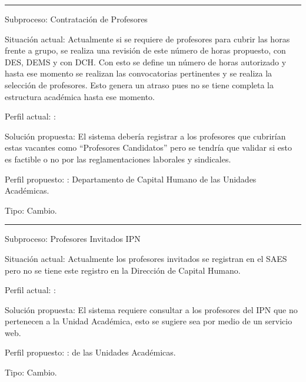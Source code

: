 \hrule
\vspace{0.2cm}
\begin{Cdescription}
	\item[Subproceso:] Contratación de Profesores
	\item[Situación actual:] Actualmente si se requiere de profesores para cubrir las horas frente a grupo, se realiza una revisión de este número de horas propuesto, con DES, DEMS y con DCH. Con esto se define un número de horas autorizado y hasta ese momento se realizan las convocatorias pertinentes y se realiza la selección de profesores. Esto genera un atraso pues no se tiene completa la estructura académica hasta ese momento.  
	\item[Perfil actual:] :
	\item[Solución propuesta:] 
	El sistema debería registrar a los profesores que cubrirían estas vacantes como ``Profesores Candidatos'' pero se tendría que validar si esto es factible o no por las reglamentaciones laborales y sindicales. 
	
	\item[Perfil propuesto:] : Departamento de Capital Humano de las Unidades Académicas.
	\item[Tipo:] Cambio.
\end{Cdescription}

\hrule
\vspace{0.2cm}
\begin{Cdescription}
	\item[Subproceso:] Profesores Invitados IPN
	\item[Situación actual:] Actualmente los profesores invitados se registran en el SAES pero no se tiene este registro en la Dirección de Capital Humano.  
	\item[Perfil actual:] :
	\item[Solución propuesta:] 
	El sistema requiere consultar a los profesores del IPN que no pertenecen a la Unidad Académica, esto se sugiere sea por medio de un servicio web. 

    \item[Perfil propuesto:] :  de las Unidades Académicas.
	\item[Tipo:] Cambio.
\end{Cdescription}

